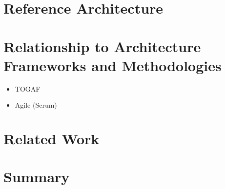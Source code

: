 
\section{Reference Architecture}

\section{Relationship to Architecture Frameworks and Methodologies} %
\label{sec:ch6_relation_frameworks}

\begin{itemize}
	\item TOGAF
	\item Agile (Scrum)
\end{itemize}


\section{Related Work}

\section{Summary} 
